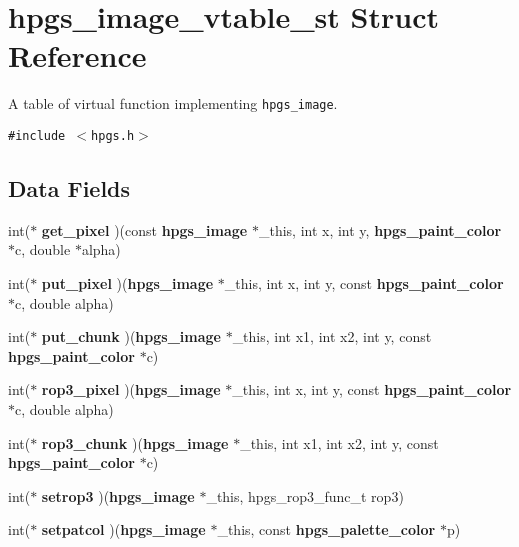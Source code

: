 \section{hpgs\_\-image\_\-vtable\_\-st Struct Reference}
\label{structhpgs__image__vtable__st}
A table of virtual function implementing {\tt hpgs\_\-image}.  


{\tt \#include $<$hpgs.h$>$}

\subsection*{Data Fields}
\begin{CompactItemize}
\item 
int($\ast$ \textbf{get\_\-pixel} )(const {\bf hpgs\_\-image} $\ast$\_\-this, int x, int y, {\bf hpgs\_\-paint\_\-color} $\ast$c, double $\ast$alpha)\label{structhpgs__image__vtable__st_24697076d67611f88835060e2f30884d}

\item 
int($\ast$ \textbf{put\_\-pixel} )({\bf hpgs\_\-image} $\ast$\_\-this, int x, int y, const {\bf hpgs\_\-paint\_\-color} $\ast$c, double alpha)\label{structhpgs__image__vtable__st_66e1b74c2607eb37f62167bb17e32b39}

\item 
int($\ast$ \textbf{put\_\-chunk} )({\bf hpgs\_\-image} $\ast$\_\-this, int x1, int x2, int y, const {\bf hpgs\_\-paint\_\-color} $\ast$c)\label{structhpgs__image__vtable__st_2f20abbb1d3ac9d59ff6068719a89c1c}

\item 
int($\ast$ \textbf{rop3\_\-pixel} )({\bf hpgs\_\-image} $\ast$\_\-this, int x, int y, const {\bf hpgs\_\-paint\_\-color} $\ast$c, double alpha)\label{structhpgs__image__vtable__st_f1ba1936b0a98b83080709f817f4934a}

\item 
int($\ast$ \textbf{rop3\_\-chunk} )({\bf hpgs\_\-image} $\ast$\_\-this, int x1, int x2, int y, const {\bf hpgs\_\-paint\_\-color} $\ast$c)\label{structhpgs__image__vtable__st_3b083af8bdb207c73d8a8a632be8a604}

\item 
int($\ast$ \textbf{setrop3} )({\bf hpgs\_\-image} $\ast$\_\-this, hpgs\_\-rop3\_\-func\_\-t rop3)\label{structhpgs__image__vtable__st_bd1080e2297c9d0debe6281186c2f003}

\item 
int($\ast$ \textbf{setpatcol} )({\bf hpgs\_\-image} $\ast$\_\-this, const {\bf hpgs\_\-palette\_\-color} $\ast$p)\label{structhpgs__image__vtable__st_b92201524525b754e22872a248a58958}


\end{CompactItemize}
